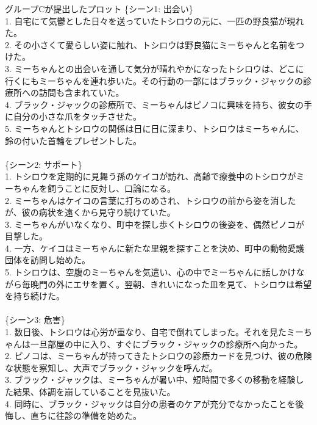 \documentclass[a4j,12pt]{jsreport}
\begin{document}
\vspace{20pt}
\begin{breakitembox}
   [l]{グループCが提出したプロット}
   \noindent\{シーン1: 出会い\}\\
   1. 自宅にて気鬱とした日々を送っていたトシロウの元に、一匹の野良猫が現れた。\\
   2. その小さくて愛らしい姿に触れ、トシロウは野良猫にミーちゃんと名前をつけた。\\
   3. ミーちゃんとの出会いを通して気分が晴れやかになったトシロウは、どこに行くにもミーちゃんを連れ歩いた。その行動の一部にはブラック・ジャックの診療所への訪問も含まれていた。\\
   4. ブラック・ジャックの診療所で、ミーちゃんはピノコに興味を持ち、彼女の手に自分の小さな爪をタッチさせた。\\
   5. ミーちゃんとトシロウの関係は日に日に深まり、トシロウはミーちゃんに、鈴の付いた首輪をプレゼントした。\\
   \\
   \{シーン2: サポート\}\\
   1. トシロウを定期的に見舞う孫のケイコが訪れ、高齢で療養中のトシロウがミーちゃんを飼うことに反対し、口論になる。\\
   2. ミーちゃんはケイコの言葉に打ちのめされ、トシロウの前から姿を消したが、彼の病状を遠くから見守り続けていた。\\
   3. ミーちゃんがいなくなり、町中を探し歩くトシロウの後姿を、偶然ピノコが目撃した。\\
   4. 一方、ケイコはミーちゃんに新たな里親を探すことを決め、町中の動物愛護団体を訪問し始めた。\\
   5. トシロウは、空腹のミーちゃんを気遣い、心の中でミーちゃんに話しかけながら毎晩門の外にエサを置く。翌朝、きれいになった皿を見て、トシロウは希望を持ち続けた。\\
   \\
   \{シーン3: 危害\}\\
   1. 数日後、トシロウは心労が重なり、自宅で倒れてしまった。それを見たミーちゃんは一旦部屋の中に入り、すぐにブラック・ジャックの診療所へ向かった。\\
   2. ピノコは、ミーちゃんが持ってきたトシロウの診療カードを見つけ、彼の危険な状態を察知し、大声でブラック・ジャックを呼んだ。\\
   3. ブラック・ジャックは、ミーちゃんが暑い中、短時間で多くの移動を経験した結果、体調を崩していることを見抜いた。\\
   4. 同時に、ブラック・ジャックは自分の患者のケアが充分でなかったことを後悔し、直ちに往診の準備を始めた。\\

\end{breakitembox}
\end{document}
